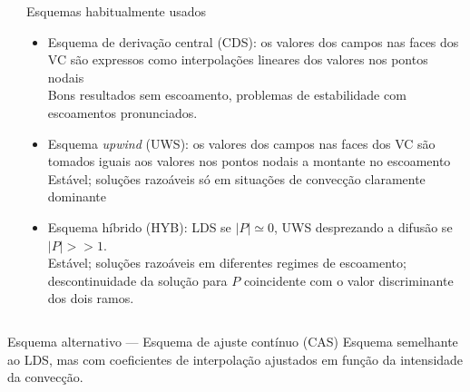 \documentclass[final,t]{beamer}
\begin{document}
\begin{frame}{}
\begin{columns}[t]
\begin{column}{0.488\linewidth}
\end{column}


\hfill
\begin{column}{.488\linewidth}
    \begin{block}{Esquemas habitualmente usados}
        \begin{itemize}
            \item Esquema de derivação central (CDS): os valores dos campos nas
                faces dos VC são expressos como interpolações lineares dos
                valores nos pontos nodais\\
                Bons resultados sem escoamento, problemas de estabilidade com
                escoamentos pronunciados.
            \item Esquema \emph{upwind} (UWS): os valores dos campos nas  faces
                dos VC são tomados iguais aos valores nos pontos nodais a
                montante no escoamento\\
                Estável; soluções razoáveis só em situações de convecção
                claramente dominante
            \item Esquema híbrido (HYB): LDS se $|P|\simeq0$, UWS desprezando a
                difusão se $|P|>>1$.\\
                Estável; soluções razoáveis em diferentes regimes de escoamento;
                descontinuidade da solução para $P$ coincidente com o valor
                discriminante dos dois ramos.
                \rule[-13.5mm]{0mm}{1mm}
        \end{itemize}
    \end{block}
\end{column}
  
\end{columns}

\begin{columns}[t]
\begin{column}{\linewidth}
\begin{exampleblock}{Esquema alternativo --- Esquema de ajuste contínuo
    (CAS)}
    Esquema semelhante ao LDS, mas com coeficientes de interpolação ajustados
    em função da intensidade da convecção.
    \strut


\end{exampleblock}
\end{column}
\end{columns}
\end{frame}
\end{document}
